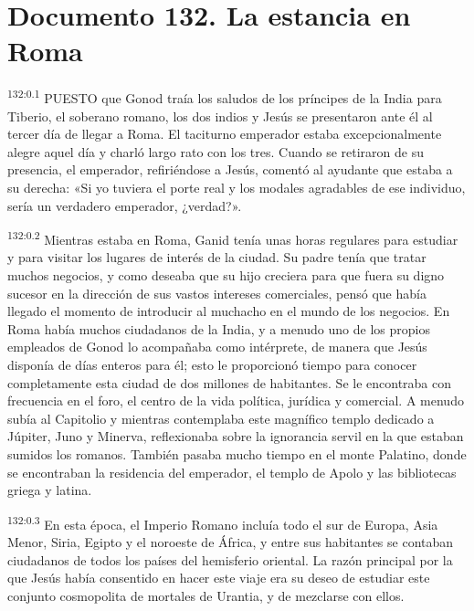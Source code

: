 \chapter{Documento 132. La estancia en Roma}
\par 
\textsuperscript{132:0.1} PUESTO que Gonod traía los saludos de los príncipes de la India para Tiberio, el soberano romano, los dos indios y Jesús se presentaron ante él al tercer día de llegar a Roma. El taciturno emperador estaba excepcionalmente alegre aquel día y charló largo rato con los tres. Cuando se retiraron de su presencia, el emperador, refiriéndose a Jesús, comentó al ayudante que estaba a su derecha: «Si yo tuviera el porte real y los modales agradables de ese individuo, sería un verdadero emperador, ¿verdad?».

\par 
\textsuperscript{132:0.2} Mientras estaba en Roma, Ganid tenía unas horas regulares para estudiar y para visitar los lugares de interés de la ciudad. Su padre tenía que tratar muchos negocios, y como deseaba que su hijo creciera para que fuera su digno sucesor en la dirección de sus vastos intereses comerciales, pensó que había llegado el momento de introducir al muchacho en el mundo de los negocios. En Roma había muchos ciudadanos de la India, y a menudo uno de los propios empleados de Gonod lo acompañaba como intérprete, de manera que Jesús disponía de días enteros para él; esto le proporcionó tiempo para conocer completamente esta ciudad de dos millones de habitantes. Se le encontraba con frecuencia en el foro, el centro de la vida política, jurídica y comercial. A menudo subía al Capitolio y mientras contemplaba este magnífico templo dedicado a Júpiter, Juno y Minerva, reflexionaba sobre la ignorancia servil en la que estaban sumidos los romanos. También pasaba mucho tiempo en el monte Palatino, donde se encontraban la residencia del emperador, el templo de Apolo y las bibliotecas griega y latina.

\par 
\textsuperscript{132:0.3} En esta época, el Imperio Romano incluía todo el sur de Europa, Asia Menor, Siria, Egipto y el noroeste de África, y entre sus habitantes se contaban ciudadanos de todos los países del hemisferio oriental. La razón principal por la que Jesús había consentido en hacer este viaje era su deseo de estudiar este conjunto cosmopolita de mortales de Urantia, y de mezclarse con ellos.

